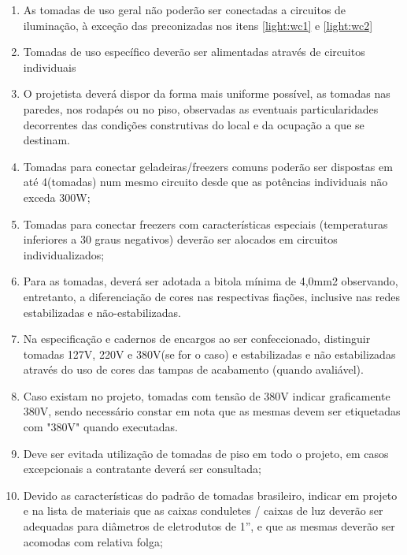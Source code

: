 \begin{enumerate}
	\item As tomadas de uso geral não poderão ser conectadas a circuitos de iluminação, à exceção das preconizadas nos itens \ref*{light:wc1} e \ref*{light:wc2}
	 
	\item Tomadas de uso específico deverão ser alimentadas através de circuitos individuais
	
	\item O projetista deverá dispor da forma mais uniforme possível, as tomadas nas paredes, nos rodapés ou no piso, observadas as eventuais particularidades decorrentes das condições construtivas do local e da ocupação a que se destinam.

	\item Tomadas para conectar geladeiras/freezers comuns poderão ser dispostas em até 4(tomadas) num mesmo circuito desde que as potências individuais não exceda 300W;
	
	\item Tomadas para conectar freezers com características especiais (temperaturas inferiores a 30 graus negativos) deverão ser alocados em circuitos individualizados;

	\item Para as tomadas, deverá ser adotada a bitola mínima de 4,0mm2 observando, entretanto, a diferenciação de cores nas respectivas fiações, inclusive nas redes estabilizadas e não-estabilizadas.

	\item Na especificação e cadernos de encargos ao ser confeccionado, distinguir tomadas 127V, 220V e 380V(se for o caso) e estabilizadas e não estabilizadas através do uso de cores das tampas de acabamento (quando avaliável).
	
	\item Caso existam no projeto, tomadas com tensão de 380V indicar graficamente 380V, sendo necessário constar em nota que as mesmas devem ser etiquetadas com "380V" quando executadas.
	
	\item Deve ser evitada utilização de tomadas de piso em todo o projeto, em casos excepcionais a contratante deverá ser consultada;
	
	\item Devido as características do padrão de tomadas brasileiro, indicar em projeto e na lista de materiais que as caixas conduletes / caixas de luz deverão ser adequadas para diâmetros de eletrodutos de 1”, e que as mesmas deverão ser acomodas com relativa folga;
	

\end{enumerate}
